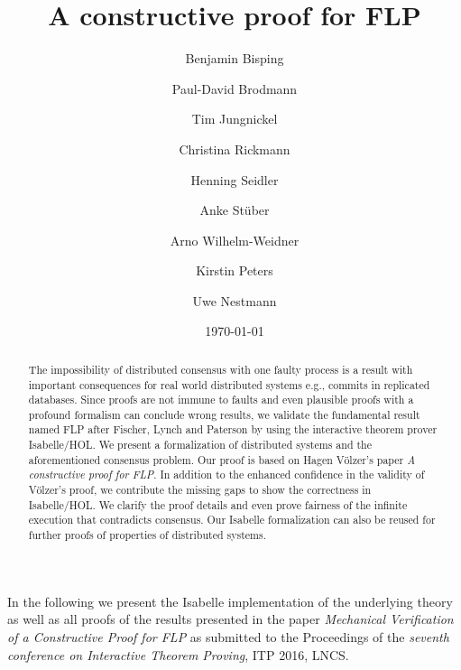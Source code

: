 \documentclass[11pt,a4paper]{article}
\title{A constructive proof for FLP}
\author{Benjamin Bisping \and Paul-David Brodmann \and Tim Jungnickel \and
  Christina Rickmann \and Henning Seidler \and Anke St\"uber  \and Arno Wilhelm-Weidner \and
 Kirstin Peters \and Uwe Nestmann}
\date{\today}
\begin{document}
\maketitle

\begin{abstract}
	The impossibility of distributed consensus with one faulty process is a result with important consequences for real world distributed systems e.g., commits in replicated databases. 
	Since proofs are not immune to faults and even plausible proofs with a profound formalism can conclude wrong results, we validate the fundamental result named FLP after Fischer, Lynch and Paterson by using the interactive theorem prover Isabelle/HOL.
	We present a formalization of distributed systems and the aforementioned consensus problem.
	Our proof is based on Hagen Völzer's paper \emph{A constructive proof for FLP}.
	In addition to the enhanced confidence in the validity of Völzer's proof, we contribute the missing gaps to show the correctness in Isabelle/HOL. 
	We clarify the proof details and even prove fairness of the infinite execution that contradicts consensus. 
	Our Isabelle formalization can also be reused for further proofs of properties of distributed systems.
\end{abstract}
In the following we present the Isabelle implementation of the underlying theory as well as all proofs of the results presented in the paper \emph{Mechanical Verification of a Constructive Proof for FLP} as submitted to the Proceedings of the \textit{seventh conference on Interactive Theorem Proving}, ITP 2016, LNCS. 
\newpage

\tableofcontents
\newpage





\end{document}
